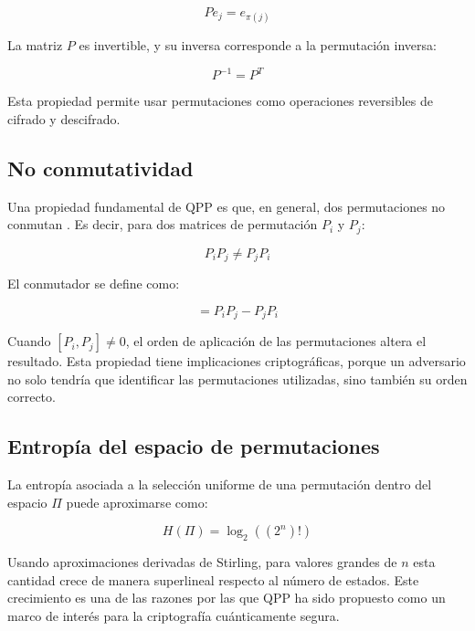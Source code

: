 \begin{equation}
    P e_j = e_{\pi(j)}
\end{equation}

La matriz $P$ es invertible, y su inversa corresponde a la permutación inversa:

\begin{equation}
    P^{-1} = P^{T}
\end{equation}

Esta propiedad permite usar permutaciones como operaciones reversibles de cifrado y descifrado.

\subsection{No conmutatividad}

Una propiedad fundamental de QPP es que, en general, dos permutaciones no conmutan \cite{Kuang2024QPPGroup,Kuang2020ShannonSpace}. Es decir, para dos matrices de permutación $P_i$ y $P_j$:

\begin{equation}
    P_i P_j \neq P_j P_i
\end{equation}

El conmutador se define como:

\begin{equation}
    [P_i,P_j] = P_iP_j - P_jP_i
\end{equation}

Cuando $[P_i,P_j] \neq 0$, el orden de aplicación de las permutaciones altera el resultado. Esta propiedad tiene implicaciones criptográficas, porque un adversario no solo tendría que identificar las permutaciones utilizadas, sino también su orden correcto.

\subsection{Entropía del espacio de permutaciones}

La entropía asociada a la selección uniforme de una permutación dentro del espacio $\Pi$ puede aproximarse como:

\begin{equation}
    H(\Pi) = \log_2((2^n)!)
\end{equation}

Usando aproximaciones derivadas de Stirling, para valores grandes de $n$ esta cantidad crece de manera superlineal respecto al número de estados. Este crecimiento es una de las razones por las que QPP ha sido propuesto como un marco de interés para la criptografía cuánticamente segura.

